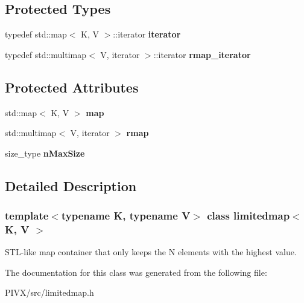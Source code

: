 \subsection*{Protected Types}
\begin{DoxyCompactItemize}
\item 
\mbox{\label{classlimitedmap_aea661213ab6f699e9667bea25bf99821}} 
typedef std\+::map$<$ K, V $>$\+::iterator {\bfseries iterator}
\item 
\mbox{\label{classlimitedmap_ad3d926b1f365d819073ddaed8daa4400}} 
typedef std\+::multimap$<$ V, iterator $>$\+::iterator {\bfseries rmap\+\_\+iterator}
\end{DoxyCompactItemize}
\subsection*{Protected Attributes}
\begin{DoxyCompactItemize}
\item 
\mbox{\label{classlimitedmap_a66e668a5286b7b82061c6867548897a0}} 
std\+::map$<$ K, V $>$ {\bfseries map}
\item 
\mbox{\label{classlimitedmap_ab4a6f5b1572ee3754d53f7773b381eb2}} 
std\+::multimap$<$ V, iterator $>$ {\bfseries rmap}
\item 
\mbox{\label{classlimitedmap_a3ff20a34a489085042060796d44a644e}} 
size\+\_\+type {\bfseries n\+Max\+Size}
\end{DoxyCompactItemize}


\subsection{Detailed Description}
\subsubsection*{template$<$typename K, typename V$>$\newline
class limitedmap$<$ K, V $>$}

S\+T\+L-\/like map container that only keeps the N elements with the highest value. 

The documentation for this class was generated from the following file\+:\begin{DoxyCompactItemize}
\item 
P\+I\+V\+X/src/limitedmap.\+h\end{DoxyCompactItemize}
